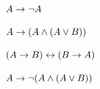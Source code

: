 \begin{compactlist}
\item  $A \rightarrow \neg A$ \vspace{.5ex}							

%
\item $A \rightarrow (A \wedge (A \vee B))$ \vspace{.5ex}	

%

\item $(A \rightarrow B) \leftrightarrow (B \rightarrow A)$ 	\vspace{.5ex}				%
%
%
%

\item $A \rightarrow \neg(A \wedge (A \vee B)) $	\vspace{.5ex}	

%
%
%


\end{compactlist}
